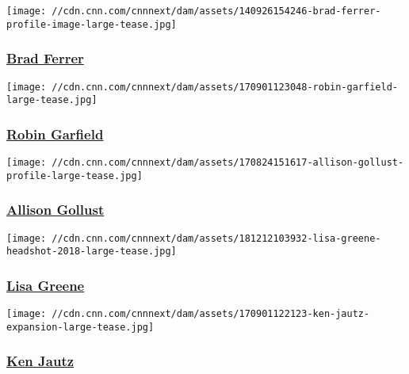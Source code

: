 \href{/profiles/brad-ferrer-profile}{}

\texttt{[image: //cdn.cnn.com/cnnnext/dam/assets/140926154246-brad-ferrer-profile-image-large-tease.jpg]}

\hypertarget{brad-ferrer}{%
\subsubsection{\texorpdfstring{\href{/profiles/brad-ferrer-profile}{Brad
Ferrer}}{Brad Ferrer}}\label{brad-ferrer}}

\href{/profiles/robin-garfield-profile}{}

\texttt{[image: //cdn.cnn.com/cnnnext/dam/assets/170901123048-robin-garfield-large-tease.jpg]}

\hypertarget{robin-garfield}{%
\subsubsection{\texorpdfstring{\href{/profiles/robin-garfield-profile}{Robin
Garfield}}{Robin Garfield}}\label{robin-garfield}}

\href{/profiles/allison-gollust-profile}{}

\texttt{[image: //cdn.cnn.com/cnnnext/dam/assets/170824151617-allison-gollust-profile-large-tease.jpg]}

\hypertarget{allison-gollust}{%
\subsubsection{\texorpdfstring{\href{/profiles/allison-gollust-profile}{Allison
Gollust}}{Allison Gollust}}\label{allison-gollust}}

\href{/profiles/lisa-greene-profile}{}

\texttt{[image: //cdn.cnn.com/cnnnext/dam/assets/181212103932-lisa-greene-headshot-2018-large-tease.jpg]}

\hypertarget{lisa-greene}{%
\subsubsection{\texorpdfstring{\href{/profiles/lisa-greene-profile}{Lisa
Greene}}{Lisa Greene}}\label{lisa-greene}}

\href{/profiles/ken-jautz-profile}{}

\texttt{[image: //cdn.cnn.com/cnnnext/dam/assets/170901122123-ken-jautz-expansion-large-tease.jpg]}

\hypertarget{ken-jautz}{%
\subsubsection{\texorpdfstring{\href{/profiles/ken-jautz-profile}{Ken
Jautz}}{Ken Jautz}}\label{ken-jautz}}

